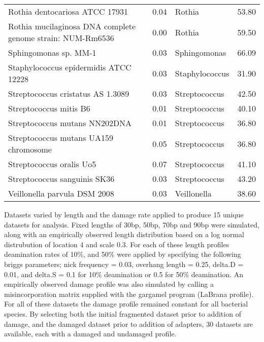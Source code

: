 \documentclass[12pt, a4paper]{article}
\begin{document}
\begin{table}[ht]
\begin{tabular}{C{7.5cm} C{2.5cm} C{3cm} R{1.5cm} }
	Rothia dentocariosa ATCC 17931 & 0.04 & Rothia & 53.80 \\ 
	Rothia mucilaginosa DNA complete genome strain: NUM-Rm6536 & 0.00 & Rothia & 59.50 \\ 
	Sphingomonas sp. MM-1 & 0.03 & Sphingomonas & 66.09 \\ 
	Staphylococcus epidermidis ATCC 12228 & 0.03 & Staphylococcus & 31.90 \\ 
	Streptococcus cristatus AS 1.3089 & 0.03 & Streptococcus & 42.50 \\ 
	Streptococcus mitis B6 & 0.01 & Streptococcus & 40.10 \\ 
	Streptococcus mutans NN202DNA & 0.01 & Streptococcus & 36.80 \\ 
	Streptococcus mutans UA159 chromosome & 0.05 & Streptococcus & 36.80 \\ 
	Streptococcus oralis Uo5 & 0.07 & Streptococcus & 41.10 \\ 
	Streptococcus sanguinis SK36 & 0.03 & Streptococcus & 43.20 \\ 
	Veillonella parvula DSM 2008 & 0.03 & Veillonella & 38.60 \\ 
   \hline
\end{tabular}
\end{table}
\clearpage

Datasets varied by length and the damage rate applied to produce 15 unique datasets for analysis. Fixed lengths of 30bp, 50bp, 70bp and 90bp were simulated, along with an empirically observed length distribution based on  a log normal distrubution of location 4 and scale 0.3. For each of these length profiles deamination rates of 10\%, and 50\% were applied by specifying the following briggs parameters; nick frequency = 0.03, overhang length = 0.25, delta.D = 0.01, and delta.S = 0.1 for 10\% deamination or 0.5 for 50\% deamination. An empirically observed damage profile was also simulated by calling a misincorporation matrix supplied with the gargamel program (LaBrana profile). For all of these datasets the damage profile remained constant for all bacterial species. 
By selecting both the initial fragmented dataset prior to addition of damage, and the damaged dataset prior to addition of adapters, 30 datasets are available, each with a damaged and undamaged profile.
\end{document}
